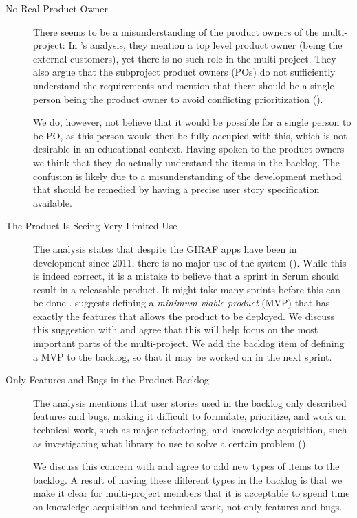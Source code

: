 \begin{description}
  \item[No Real Product Owner] There seems to be a misunderstanding of the product owners of the multi-project: In 's analysis, they mention a top level product owner (being the external customers), yet there is no such role in the multi-project. They also argue that the subproject product owners (POs) do not sufficiently understand the requirements and mention that there should be a single person being the product owner to avoid conflicting prioritization ().

We do, however, not believe that it would be possible for a single person to be PO, as this person would then be fully occupied with this, which is not desirable in an educational context. Having spoken to the product owners we think that they do actually understand the items in the backlog. The confusion is likely due to a misunderstanding of the development method that should be remedied by having a precise user story specification available.
  \item[The Product Is Seeing Very Limited Use] The analysis states that despite the GIRAF apps have been in development since 2011, there is no major use of the system (). While this is indeed correct, it is a mistake to believe that a sprint in Scrum should result in a releasable product. It might take many sprints before this can be done \parencite{larman2003}.  suggests defining a \emph{minimum viable product} (MVP) that has exactly the features that allows the product to be deployed. We discuss this suggestion with  and agree that this will help focus on the most important parts of the multi-project. We add the backlog item of defining a MVP to the backlog, so that it may be worked on in the next sprint.
  \item[Only Features and Bugs in the Product Backlog] The analysis mentions that user stories used in the backlog only described features and bugs, making it difficult to formulate, prioritize, and work on technical work, such as major refactoring, and knowledge acquisition, such as investigating what library to use to solve a certain problem ().

We discuss this concern with  and agree to add new types of items to the backlog. A result of having these different types in the backlog is that we make it clear for multi-project members that it is acceptable to spend time on knowledge acquisition and technical work, not only features and bugs.
\end{description}

